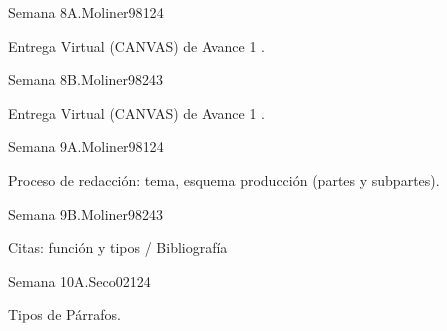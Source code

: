 \begin{syllabus}
\begin{unit}{Semana 8A.}{Moliner98}{12}{4}
   \begin{topics}
      \item Entrega Virtual (CANVAS) de Avance 1 .
   \end{topics}
   \begin{unitgoals}
      \item 
   \end{unitgoals}
\end{unit}

\begin{unit}{Semana 8B.}{Moliner98}{24}{3}
   \begin{topics}
      \item Entrega Virtual (CANVAS) de Avance 1 .
   \end{topics}

   \begin{unitgoals}
      \item 
      \item
      \item 
      \end{unitgoals}
\end{unit}

\begin{unit}{Semana 9A.}{Moliner98}{12}{4}
   \begin{topics}
      \item Proceso de redacción: tema, esquema producción (partes y subpartes).
   \end{topics}
   \begin{unitgoals}
      \item 
   \end{unitgoals}
\end{unit}

\begin{unit}{Semana 9B.}{Moliner98}{24}{3}
   \begin{topics}
      \item Citas: función y tipos / Bibliografía 
   \end{topics}

   \begin{unitgoals}
      \item 
      \item
      \item 
      \end{unitgoals}
\end{unit}


\begin{unit}{Semana 10A.}{Seco02}{12}{4}
   \begin{topics}
      \item Tipos de Párrafos.
   \end{topics}
   \begin{unitgoals}
      \item 
   \end{unitgoals}
\end{unit}


\end{syllabus}
